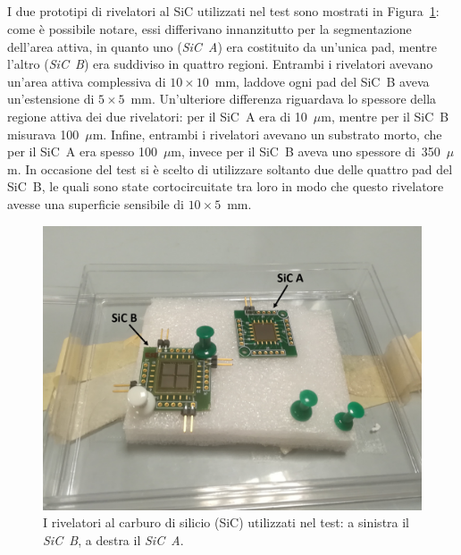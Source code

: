 

\subsection{}



I due prototipi di rivelatori al SiC utilizzati nel test sono mostrati in Figura~\ref{fig:sic}: come è possibile notare, essi differivano innanzitutto per la segmentazione dell'area attiva, in quanto uno (\emph{SiC~A}) era costituito da un'unica pad, mentre l'altro (\emph{SiC~B}) era suddiviso in quattro regioni. 
Entrambi i rivelatori avevano un'area attiva complessiva di $10 \times 10$~mm, laddove ogni pad del SiC~B aveva un'estensione di $5 \times 5$~mm.
Un'ulteriore differenza riguardava lo spessore della regione attiva dei due rivelatori: per il SiC~A era di 10~$\mu$m, mentre per il SiC~B misurava 100~$\mu$m.
Infine, entrambi i rivelatori avevano un substrato morto, che per il SiC~A era spesso 100~$\mu$m, invece per il SiC~B aveva uno spessore di~350~$\mu$m.
In occasione del test si è scelto di utilizzare soltanto due delle quattro pad del SiC~B, le quali sono state cortocircuitate tra loro in modo che questo rivelatore avesse una superficie sensibile di $10 \times 5$~mm.



\begin{figure} [!p]
	\centering
	\includegraphics[scale=0.42]{Grafici/sic_etichette.png}
	\caption{I rivelatori al carburo di silicio (SiC) utilizzati nel test: a sinistra il \emph{SiC~B}, a destra il \emph{SiC~A}.} \label{fig:sic}
\end{figure}

